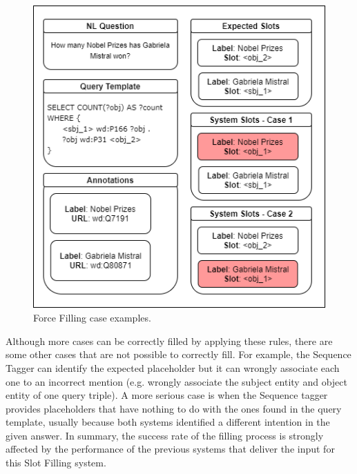 \begin{figure}[!h]
    \centering
    \includegraphics[scale=.5]{imagenes/3_system_overview/SlotFillingSpecialCases.png}
    \caption{Force Filling case examples.}
    \label{fig:forceFillingExample}
\end{figure}

Although more cases can be correctly filled by applying these rules, there are some other 
cases that are not possible to correctly fill. For example, the Sequence Tagger can identify 
the expected placeholder but it can wrongly associate each one to an incorrect mention (e.g. 
wrongly associate the subject entity and object entity of one query triple). A more serious 
case is when the Sequence tagger provides placeholders that have nothing to do with the ones 
found in the query template, usually because both systems identified a different intention in 
the given answer. In summary, the success rate of the filling process is strongly affected by 
the performance of the previous systems that deliver the input for this Slot Filling system.
